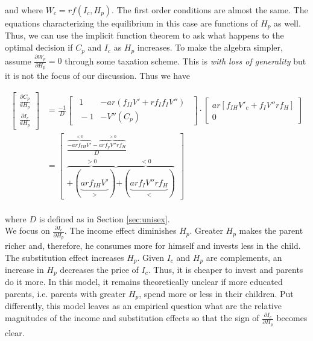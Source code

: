 \noindent and where $W_{c} = r f(I_{c}, H_{p})$. The first order conditions are almost the same. The equations characterizing the equilibrium in this case are functions of $H_{p}$ as well. Thus, we can use the implicit function theorem to ask what happens to the optimal decision if $C_{p}$ and $I_{c}$ as $H_{p}$ increases. To make the algebra simpler, assume $\frac{\partial W_{p}}{\partial H_{p}} = 0$ through some taxation scheme. This is \textit{with loss of generality} but it is not the focus of our discussion. Thus we have

\begin{align*}
\begin{bmatrix}
\frac{\partial C_p}{dH_p} \\
\frac{\partial I_c}{dH_p}
\end{bmatrix} &= \frac{-1}{D} \begin{bmatrix}
                                \ \ 1 & - a r (f_{II} V' + r f_I f_I V'')\ \ \\
                                \ \ -1 & -V''(C_p)\ \
                             \end{bmatrix} \cdot \begin{bmatrix}
                                                    a r [f_{IH} V'_c + f_I V'' r f_H] \\
                                                    0
                                                 \end{bmatrix} \\
              &= \begin{bmatrix}
                    \frac{\overbrace{-a r f_{IH} V'}^{ < 0} - \overbrace{a r f_y V'' r f_H}^{> 0}}{D} \\
                    \overbrace{+ (\underbrace{a r f_{IH} V'}_{>})}^{> 0} \overbrace{+ (\underbrace{a r f_I V'' r f_H}_{<})}^{< 0}
                 \end{bmatrix} \\
\end{align*}


\noindent where $D$ is defined as in  Section \ref{sec:unisex}.\\
\indent We focus on $\frac{\partial I_{c}}{\partial H_{p}}$. The income effect diminishes $H_{p}$. Greater $H_{p}$ makes the parent richer and, therefore, he consumes more for himself and invests less in the child. The substitution effect increases $H_{p}$. Given $I_{c}$ and $H_{p}$ are complements, an increase in $H_{p}$ decreases the price of $I_{c}$. Thus, it is cheaper to invest and parents do it more. In this model, it remains theoretically unclear if more educated parents, i.e. parents with greater $H_{p}$, spend more or less in their children. Put differently, this model leaves as an empirical question what are the relative magnitudes of the income and substitution effects so that the sign of $\frac{\partial I_{c}}{\partial H_{p}}$ becomes clear.\\

